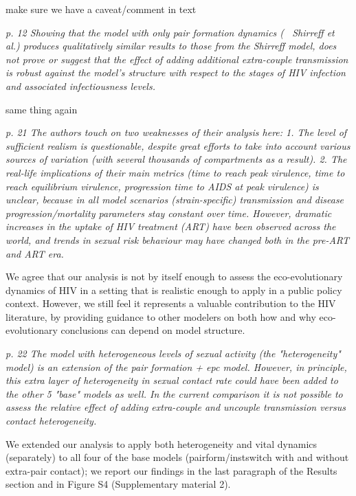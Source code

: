 \documentclass[10pt]{letter}
\newcommand{\revcomment}[1]{\emph{#1}}
\newcommand{\response}[1]{#1}
\begin{document}
\begin{letter}{
}
\response{make sure we have a caveat/comment in text}

\revcomment{
p. 12 Showing that the model with only pair formation dynamics (~
Shirreff et al.) produces qualitatively similar results to those from
the Shirreff model, does not prove or suggest that the effect of
adding additional extra-couple transmission is robust against the
model's structure with respect to the stages of HIV infection and
associated infectiousness levels.
}

\response{same thing again}

\revcomment{
p. 21 The authors touch on two weaknesses of their analysis here: 1. The level of sufficient realism is questionable, despite great efforts to take into account various sources of variation (with several thousands of compartments as a result).
2. The real-life implications of their main metrics (time to reach
peak virulence, time to reach equilibrium virulence, progression time
to AIDS at peak virulence) is unclear, because in all model scenarios
(strain-specific) transmission and disease progression/mortality
parameters stay constant over time. However, dramatic increases in the
uptake of HIV treatment (ART) have been observed across the world, and
trends in sexual risk behaviour may have changed both in the pre-ART
and ART era.
}

\response{
We agree that our analysis is not by itself enough to assess 
the eco-evolutionary dynamics of HIV in a setting that is realistic
enough to apply in a public policy context. However, we still feel
it represents a valuable contribution to the HIV literature, by
providing guidance to other modelers on both how and why 
eco-evolutionary conclusions can depend on model structure.
}

\revcomment{
p. 22  The model with heterogeneous levels of sexual activity (the
"heterogeneity" model) is an extension of the pair formation + epc
model. However, in principle, this extra layer of heterogeneity in
sexual contact rate could have been added to the other 5 "base" models
as well. In the current comparison it is not possible to assess the
relative effect of adding extra-couple and uncouple transmission
versus contact heterogeneity.
}

\response{
We extended our analysis to apply both heterogeneity and vital dynamics
(separately) to all four of the base models (pairform/instswitch with
and without extra-pair contact); we report our findings in the
last paragraph of the Results section and in Figure S4 (Supplementary material 2).
}


\end{letter}
\end{document}

